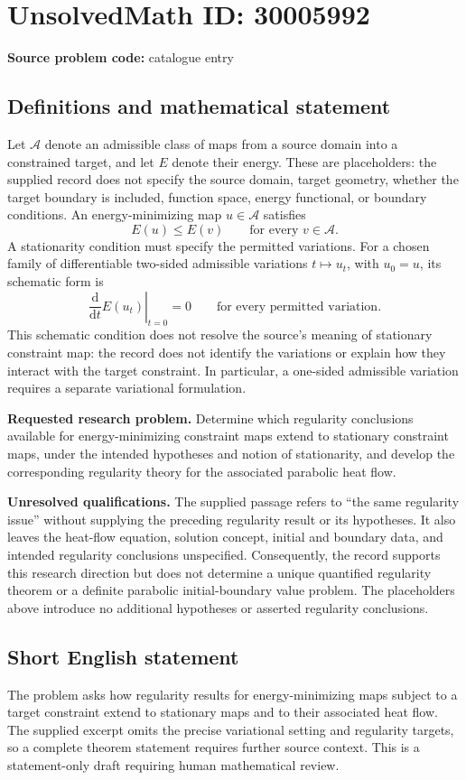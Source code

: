 \documentclass[11pt]{article}
\begin{document}
\section*{UnsolvedMath ID: 30005992}
\textbf{Source problem code:} catalogue entry
\subsection{Definitions and mathematical statement}
Let \(\mathcal A\) denote an admissible class of maps from a source domain into a constrained target, and let \(E\) denote their energy. These are placeholders: the supplied record does not specify the source domain, target geometry, whether the target boundary is included, function space, energy functional, or boundary conditions. An energy-minimizing map \(u\in\mathcal A\) satisfies
\[
E(u)\leq E(v)\qquad\text{for every }v\in\mathcal A.
\]
A stationarity condition must specify the permitted variations. For a chosen family of differentiable two-sided admissible variations \(t\mapsto u_t\), with \(u_0=u\), its schematic form is
\[
\left.\frac{\mathrm d}{\mathrm dt}E(u_t)\right|_{t=0}=0
\qquad\text{for every permitted variation.}
\]
This schematic condition does not resolve the source's meaning of stationary constraint map: the record does not identify the variations or explain how they interact with the target constraint. In particular, a one-sided admissible variation requires a separate variational formulation.

\textbf{Requested research problem.} Determine which regularity conclusions available for energy-minimizing constraint maps extend to stationary constraint maps, under the intended hypotheses and notion of stationarity, and develop the corresponding regularity theory for the associated parabolic heat flow.

\textbf{Unresolved qualifications.} The supplied passage refers to ``the same regularity issue'' without supplying the preceding regularity result or its hypotheses. It also leaves the heat-flow equation, solution concept, initial and boundary data, and intended regularity conclusions unspecified. Consequently, the record supports this research direction but does not determine a unique quantified regularity theorem or a definite parabolic initial-boundary value problem. The placeholders above introduce no additional hypotheses or asserted regularity conclusions.
\subsection{Short English statement}
The problem asks how regularity results for energy-minimizing maps subject to a target constraint extend to stationary maps and to their associated heat flow. The supplied excerpt omits the precise variational setting and regularity targets, so a complete theorem statement requires further source context. This is a statement-only draft requiring human mathematical review.
\end{document}
